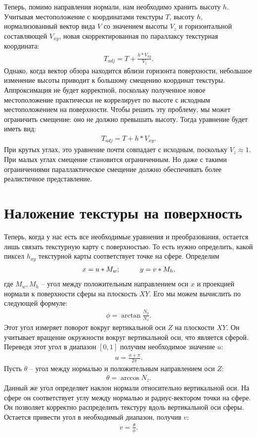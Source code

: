 Теперь, помимо направления нормали, нам необходимо хранить высоту $h$. Учитывая местоположение с координатами текстуры $T$, высоту $h$, нормализованный вектор вида $V$ со значением высоты $V_{z}$ и горизонтальной составляющей $V_{xy}$, новая скорректированная по параллаксу текстурная координата:
\begin{gather}
	T_{adj} = T + \frac{h*V_{xy}}{V_{z}}.
\end{gather}
Однако, когда вектор обзора находится вблизи горизонта поверхности, небольшое изменение высоты приводит к большому смещению координат текстуры. Аппроксимация не будет корректной, поскольку полученное новое местоположение практически не коррелирует по высоте с исходным местоположением на поверхности. Чтобы решить эту проблему, мы может ограничить смещение: оно не должно превышать высоту. Тогда уравнение будет иметь вид:
\begin{gather}
	T_{adj} = T + h*V_{xy}.
\end{gather}
При крутых углах, это уравнение почти совпадает с исходным, поскольку $V_{z} \approx 1$. При малых углах смещение становится ограниченным. Но даже с такими ограничениями параллактическое смещение должно обеспечивать более реалистичное представление.

\section{Наложение текстуры на поверхность}

Теперь, когда у нас есть все необходимые уравнения и преобразования, остается лишь связать текстурную карту с поверхностью. То есть нужно определить, какой пиксел $h_{xy}$ текстурной карты соответствует точке на сфере. Определим
\begin{gather}
	x=u*M_w; \hspace*{1cm} y=v*M_h,
\end{gather}
где $M_w, M_h$ -- угол между положительным направлением оси $x$ и проекцией нормали к поверхности сферы на плоскость $XY$. Его мы можем вычислить по следующей формуле:
\begin{gather}
	\phi=\arctan{\frac{N_y}{N_x}}.
\end{gather}
Этот угол измеряет поворот вокруг вертикальной оси $Z$ на плоскости $XY$. Он учитывает вращение окружности вокруг вертикальной оси, что является сферой. Переведя этот угол в диапазон $[0, 1]$ получим необходимое значение $u$:
\begin{gather}
	u=\frac{\phi+\pi}{2\pi}.
\end{gather}
Пусть $\theta$ -- угол между нормалью и положительным направлением оси $Z$:
\begin{gather}
	\theta=\arccos{N_z}.
\end{gather}
Данный же угол определяет наклон нормали относительно вертикальной оси. На сфере он соответствует углу между нормалью и радиус-вектором точки на сфере. Он позволяет корректно распределить текстуру вдоль вертикальной оси сферы. Остается привести угол в необходимый диапазон, получив $v$:
\begin{gather}
	v=\frac{\theta}{\phi}.
\end{gather}


